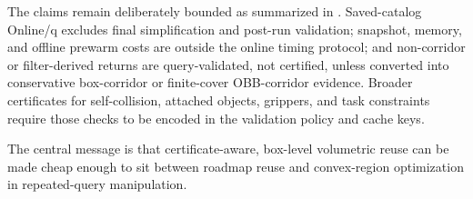 \documentclass[journal]{IEEEtran}
\newcommand{\onlineq}{\mbox{Online/q}}
\begin{document}
The claims remain deliberately bounded as summarized in
. Saved-catalog \onlineq{} excludes final
simplification and post-run validation; snapshot, memory, and offline prewarm
costs are outside the online timing protocol; and non-corridor or
filter-derived returns are query-validated, not certified, unless converted
into conservative box-corridor or finite-cover OBB-corridor evidence. Broader
certificates for self-collision, attached objects, grippers, and task
constraints require those checks to be encoded in the validation policy and
cache keys.

The central message is that certificate-aware, box-level volumetric reuse can be
made cheap enough to sit between roadmap reuse and convex-region optimization
in repeated-query manipulation.



\end{document}
